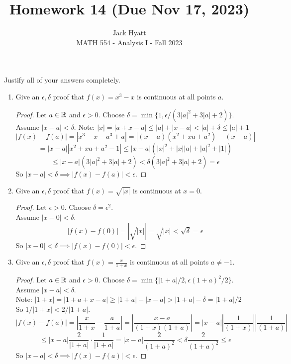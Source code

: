 \documentclass[14pt]{extarticle}
\begin{document}
	
	
	
	\title{Homework 14 (Due Nov 17, 2023)}
	\author{Jack Hyatt\\ %
		MATH 554 - Analysis I - Fall 2023} 
	
	\maketitle
	
	Justify all of your answers completely.\\
	
	
	\medskip 
	
	\begin{enumerate}
		\item Give an $\epsilon,\delta$ proof that $f(x)=x^3 - x$ is continuous at all points $a$.
		\begin{proof}
			Let $a \in \mathbb{R}$ and $\epsilon>0$. Choose $\delta = \min\{1,\epsilon/(3|a|^2+3|a|+2)\}$.\\
			Assume $|x-a| < \delta$.
			Note: $|x| = |a+x-a| \leq |a| + |x-a| < |a| + \delta \leq |a|+1$
			\[|f(x) - f(a)| = |x^3-x -a^3 +a| = |(x-a)(x^2+xa+a^2)-(x-a)|\]
			\[= |x-a||x^2+xa+a^2-1| \leq |x-a|(|x|^2 + |x||a|+|a|^2+|1|)\]
			\[\leq |x-a| (3|a|^2+3|a|+2) < \delta(3|a|^2+3|a|+2) = \epsilon\]
			So $|x-a| < \delta \implies |f(x)-f(a)| < \epsilon$.
		\end{proof}
		
		\item Give an $\epsilon,\delta$ proof that $f(x)=\sqrt{|x|}$ is continuous at $x=0$.
		\begin{proof}
			Let $\epsilon>0$. Choose $\delta = \epsilon^2$.\\
			Assume $|x-0| < \delta$.\\
			\[|f(x)-f(0)| = |\sqrt{|x|}| = \sqrt{|x|} < \sqrt{\delta} = \epsilon\]
			So $|x-0| < \delta \implies |f(x)-f(0)| < \epsilon$.
		\end{proof}
		
		\item Give an $\epsilon,\delta$ proof that $f(x)=\frac{x}{1+x}$ is continuous at all points $a\neq-1$.
		\begin{proof}
			Let $a \in \mathbb{R}$ and $\epsilon>0$. Choose $\delta = \min\{|1+a|/2,\epsilon(1+a)^2/2\}$.\\
			Assume $|x-a| < \delta$.\\
			Note: $|1+x| = |1+a+x-a| \geq |1+a| - |x-a| > |1+a| - \delta = |1+a|/2$\\
			So $1/|1+x| < 2/|1+a|$.
			\[|f(x)-f(a)| = \left|\frac{x}{1+x}-\frac{a}{1+a}\right| = \left|\frac{x-a}{(1+x)(1+a)}\right| = |x-a|\left|\frac{1}{(1+x)}\right|\left|\frac{1}{(1+a)}\right|\]
			\[\leq |x-a|\frac{2}{|1+a|}\cdot\frac{1}{|1+a|} = |x-a|\frac{2}{(1+a)^2} < \delta \frac{2}{(1+a)^2} \leq \epsilon\]
			So $|x-a| < \delta \implies |f(x)-f(a)| < \epsilon$.
		\end{proof}
		

\end{enumerate}
\end{document}
